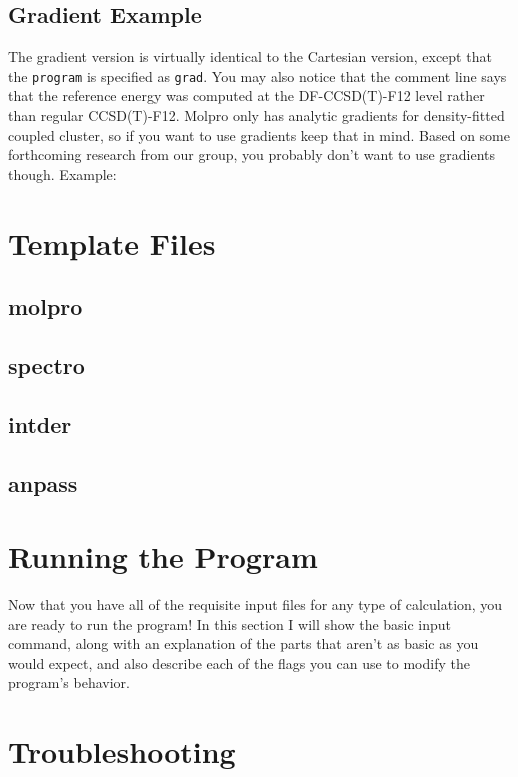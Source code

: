 \documentclass{article}
\begin{document}
\subsection{Gradient Example}

The gradient version is virtually identical to the Cartesian version,
except that the \verb|program| is specified as \verb|grad|. You may
also notice that the comment line says that the reference energy was
computed at the DF-CCSD(T)-F12 level rather than regular
CCSD(T)-F12. Molpro only has analytic gradients for density-fitted
coupled cluster, so if you want to use gradients keep that in
mind. Based on some forthcoming research from our group, you probably
don't want to use gradients though. Example:



\section{Template Files}

\subsection{molpro}
\subsection{spectro}
\subsection{intder}
\subsection{anpass}

\section{Running the Program}

Now that you have all of the requisite input files for any type of
calculation, you are ready to run the program! In this section I will
show the basic input command, along with an explanation of the parts
that aren't as basic as you would expect, and also describe each of
the flags you can use to modify the program's behavior.


\section{Troubleshooting}


\end{document}
